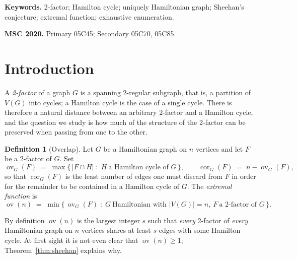 \documentclass[11pt,a4paper]{article}
\theoremstyle{definition}
\newtheorem{definition}[theorem]{Definition}
\theoremstyle{remark}
\newcommand{\ov}{\operatorname{ov}}
\newcommand{\cor}{\operatorname{cor}}
\begin{document}
\noindent\textbf{Keywords.} 2-factor; Hamilton cycle; uniquely Hamiltonian graph; Sheehan's conjecture; extremal function; exhaustive enumeration.

\noindent\textbf{MSC 2020.} Primary 05C45; Secondary 05C70, 05C85.

\section{Introduction}\label{sec:intro}

A \emph{2-factor} of a graph $G$ is a spanning $2$-regular subgraph, that is, a partition of $V(G)$ into cycles; a Hamilton cycle is the case of a single cycle. There is therefore a natural distance between an arbitrary 2-factor and a Hamilton cycle, and the question we study is how much of the structure of the 2-factor can be preserved when passing from one to the other.

\begin{definition}[Overlap]\label{def:ov}
Let $G$ be a Hamiltonian graph on $n$ vertices and let $F$ be a 2-factor of $G$. Set
\[
\ov_G(F)\;=\;\max\{\,|F\cap H|\;:\;H\ \text{a Hamilton cycle of }G\,\},
\qquad
\cor_G(F)\;=\;n-\ov_G(F),
\]
so that $\cor_G(F)$ is the least number of edges one must discard from $F$ in order for the remainder to be contained in a Hamilton cycle of $G$. The \emph{extremal function} is
\[
\ov(n)\;=\;\min\{\,\ov_G(F)\;:\;G\ \text{Hamiltonian with }|V(G)|=n,\ F\ \text{a 2-factor of }G\,\}.
\]
\end{definition}

By definition $\ov(n)$ is the largest integer $s$ such that \emph{every} 2-factor of \emph{every} Hamiltonian graph on $n$ vertices shares at least $s$ edges with some Hamilton cycle. At first sight it is not even clear that $\ov(n)\ge1$; Theorem~\ref{thm:sheehan} explains why.
\end{document}
